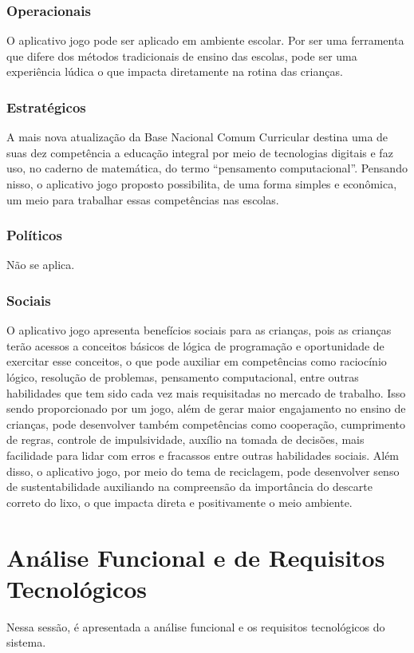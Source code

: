         \subsubsection{Operacionais}
        O aplicativo jogo pode ser aplicado em ambiente escolar. Por ser uma ferramenta que difere dos métodos tradicionais de ensino das escolas, pode ser uma experiência lúdica o que impacta diretamente na rotina das crianças.
        
        \subsubsection{Estratégicos}
        A mais nova atualização da Base Nacional Comum Curricular destina uma de suas dez competência a educação integral por meio de tecnologias digitais e faz uso, no caderno de matemática, do termo “pensamento computacional”. Pensando nisso, o aplicativo jogo proposto possibilita, de uma forma simples e econômica, um meio para trabalhar essas competências nas escolas. 
        
        \subsubsection{Políticos}
        Não se aplica.

        \subsubsection{Sociais}
        O aplicativo jogo apresenta benefícios sociais para as crianças, pois as crianças terão acessos a conceitos básicos de lógica de programação e oportunidade de exercitar esse conceitos, o que pode auxiliar em competências como raciocínio lógico, resolução de problemas, pensamento computacional, entre outras habilidades que tem sido cada vez mais requisitadas no mercado de trabalho. Isso sendo proporcionado por um jogo, além de gerar maior engajamento no ensino de crianças, pode desenvolver  também competências como cooperação, cumprimento de regras, controle de impulsividade, auxílio na tomada de decisões, mais facilidade para lidar com erros e fracassos entre outras habilidades sociais.
        Além disso, o aplicativo jogo, por meio do tema de reciclagem, pode desenvolver senso de sustentabilidade auxiliando na compreensão da importância do descarte correto do lixo, o que impacta direta e positivamente  o meio ambiente.

\section{Análise Funcional e de Requisitos Tecnológicos}
    Nessa sessão, é apresentada a análise funcional e os requisitos tecnológicos do sistema.

